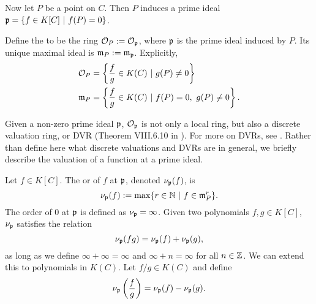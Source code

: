 Now let $P$ be a point on $C$. Then $P$ induces a prime ideal
$\frak p = \{ f \in K[C] ~|~ f(P) = 0 \}$.
\begin{comment}
\begin{proposition}
  Let $P$ be an affine point on a curve $C$ and let
  \[ \frak p = \{ f \in K[C] ~|~ f(P) = 0 \}. \]
  Then $\frak p$ is a non-zero prime ideal of $K[C]$.
\end{proposition}
\begin{proof}
  \begin{description}
    \item[$\frak p$ is non-zero:]
      Let $P = (x_0, y_0)$.
      Then $x_0$ is an element of some finite algebraic extension $L$ of $K$.
      Let $m(x)$ be the minimal polynomial of $x_0$.
      Then $m(x) \in K[x]$ is univariate, non-zero, and may be viewed instead as $m(x,y) \in K[x,y]$.
      Then $m(x_0, y_0) = m(x_0) = 0$, hence $m(x,y) \in \frak p$.
    \item[$\frak p$ is prime:]
      Suppose $fg \in \frak p$. Then
      \begin{align*}
        & (fg)(P) = 0 \\
        \implies & f(P)g(P) = 0 \\
        \implies & f(P) = 0 \text{ or } g(P) = 0 \\
        \implies & f \in \frak p \text{ or } g \in \frak p.
      \end{align*}
  \end{description}
\end{proof}
\end{comment}
Define the  to be the ring $\cal O_P := \cal O_{\frak p}$,
where $\frak p$ is the prime ideal induced by $P$.
Its unique maximal ideal is $\frak m_P := \frak m_{\frak p}$. Explicitly,
\begin{align*}
  \cal O_P &= \left\{ \frac f g \in K(C) ~|~ g(P) \neq 0 \right\} \\
  \frak m_P &= \left\{ \frac f g \in K(C) ~|~ f(P) = 0, ~g(P) \neq 0 \right\}.
\end{align*}

Given a non-zero prime ideal $\frak p$, $\cal O_{\frak p}$ is not only a local ring,
but also a discrete valuation ring, or DVR (Theorem VIII.6.10 in \cite{hungerford}).
For more on DVRs, see \cite{eisenbud95}.
Rather than define here what discrete valuations and DVRs are in general,
we briefly describe the valuation of a function at a prime ideal.

Let $f \in K[C]$.
The  or  of $f$ at $\frak p$, denoted $\nu_{\frak p}(f)$, is
\[ \nu_{\frak p}(f) := \max\{ r \in \bb N ~|~ f \in \frak m_P^r \}. \]
The order of 0 at $\frak p$ is defined as $\nu_{\frak p} = \infty$.
Given two polynomials $f, g \in K[C]$, $\nu_{\frak p}$ satisfies the relation
\[ \nu_{\frak p}(fg) = \nu_{\frak p}(f) + \nu_{\frak p}(g), \]
as long as we define $\infty + \infty = \infty$ and $\infty + n = \infty$ for all $n \in \bb Z$.
We can extend this to polynomials in $K(C)$.
Let $f/g \in K(C)$ and define
\[ \nu_{\frak p}\left(\frac f g\right) = \nu_{\frak p}(f) - \nu_{\frak p}(g). \]

